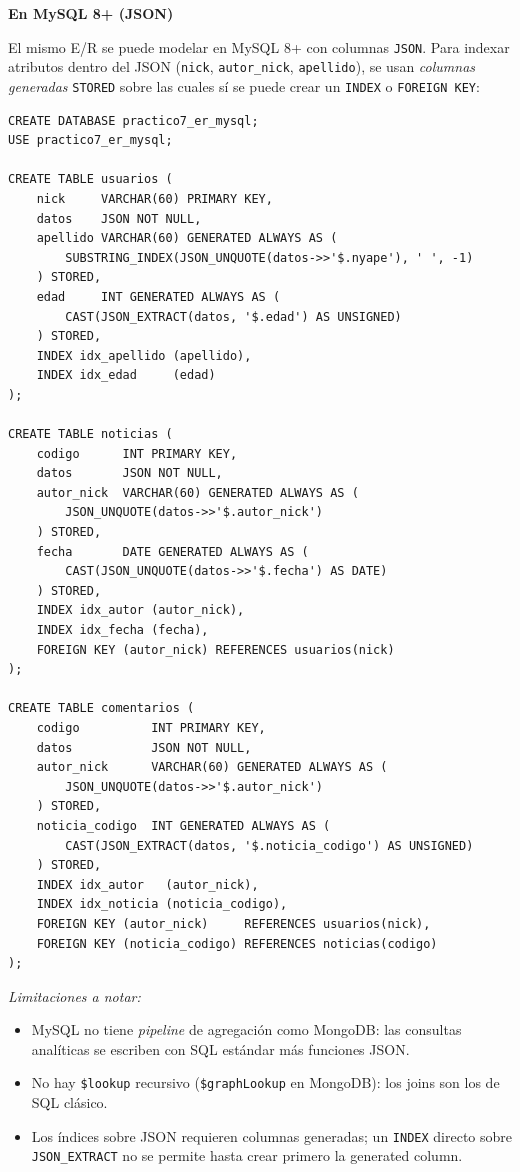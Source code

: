 \documentclass[11pt,a4paper]{article}
\newcommand{\itemcabecera}[1]{\noindent\textbf{#1}\par\medskip}
\newcommand{\bloqueMySQL}{\itemcabecera{En MySQL 8+ (JSON)}}
\begin{document}
\bloqueMySQL

El mismo E/R se puede modelar en MySQL 8+ con columnas \texttt{JSON}. Para indexar atributos dentro del JSON (\texttt{nick}, \texttt{autor\_nick}, \texttt{apellido}), se usan \emph{columnas generadas} \texttt{STORED} sobre las cuales sí se puede crear un \texttt{INDEX} o \texttt{FOREIGN KEY}:

\begin{lstlisting}[style=sqlstyle]
CREATE DATABASE practico7_er_mysql;
USE practico7_er_mysql;

CREATE TABLE usuarios (
    nick     VARCHAR(60) PRIMARY KEY,
    datos    JSON NOT NULL,
    apellido VARCHAR(60) GENERATED ALWAYS AS (
        SUBSTRING_INDEX(JSON_UNQUOTE(datos->>'$.nyape'), ' ', -1)
    ) STORED,
    edad     INT GENERATED ALWAYS AS (
        CAST(JSON_EXTRACT(datos, '$.edad') AS UNSIGNED)
    ) STORED,
    INDEX idx_apellido (apellido),
    INDEX idx_edad     (edad)
);

CREATE TABLE noticias (
    codigo      INT PRIMARY KEY,
    datos       JSON NOT NULL,
    autor_nick  VARCHAR(60) GENERATED ALWAYS AS (
        JSON_UNQUOTE(datos->>'$.autor_nick')
    ) STORED,
    fecha       DATE GENERATED ALWAYS AS (
        CAST(JSON_UNQUOTE(datos->>'$.fecha') AS DATE)
    ) STORED,
    INDEX idx_autor (autor_nick),
    INDEX idx_fecha (fecha),
    FOREIGN KEY (autor_nick) REFERENCES usuarios(nick)
);

CREATE TABLE comentarios (
    codigo          INT PRIMARY KEY,
    datos           JSON NOT NULL,
    autor_nick      VARCHAR(60) GENERATED ALWAYS AS (
        JSON_UNQUOTE(datos->>'$.autor_nick')
    ) STORED,
    noticia_codigo  INT GENERATED ALWAYS AS (
        CAST(JSON_EXTRACT(datos, '$.noticia_codigo') AS UNSIGNED)
    ) STORED,
    INDEX idx_autor   (autor_nick),
    INDEX idx_noticia (noticia_codigo),
    FOREIGN KEY (autor_nick)     REFERENCES usuarios(nick),
    FOREIGN KEY (noticia_codigo) REFERENCES noticias(codigo)
);
\end{lstlisting}

\textit{Limitaciones a notar:}

\begin{itemize}
    \item MySQL no tiene \emph{pipeline} de agregación como MongoDB: las consultas analíticas se escriben con SQL estándar más funciones JSON.
    \item No hay \texttt{\$lookup} recursivo (\texttt{\$graphLookup} en MongoDB): los joins son los de SQL clásico.
    \item Los índices sobre JSON requieren columnas generadas; un \texttt{INDEX} directo sobre \texttt{JSON\_EXTRACT} no se permite hasta crear primero la generated column.
\end{itemize}
\end{document}
